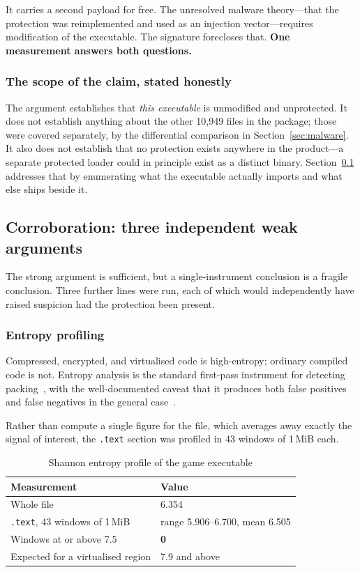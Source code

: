 It carries a second payload for free. The unresolved malware theory---that the
protection was reimplemented and used as an injection vector---requires
modification of the executable. The signature forecloses that. \textbf{One
measurement answers both questions.}

\subsubsection{The scope of the claim, stated honestly}

The argument establishes that \emph{this executable} is unmodified and
unprotected. It does not establish anything about the other 10{,}949 files in the
package; those were covered separately, by the differential comparison in
Section~\ref{sec:malware}. It also does not establish that no protection exists
anywhere in the product---a separate protected loader could in principle exist as
a distinct binary. Section~\ref{sec:corrob} addresses that by enumerating what
the executable actually imports and what else ships beside it.

\subsection{Corroboration: three independent weak arguments}
\label{sec:corrob}

The strong argument is sufficient, but a single-instrument conclusion is a fragile
conclusion. Three further lines were run, each of which would independently have
raised suspicion had the protection been present.

\subsubsection{Entropy profiling}

Compressed, encrypted, and virtualised code is high-entropy; ordinary compiled
code is not. Entropy analysis is the standard first-pass instrument for detecting
packing~\cite{lyda2007}, with the well-documented caveat that it produces both
false positives and false negatives in the general case~\cite{sokpacker}.

Rather than compute a single figure for the file, which averages away exactly the
signal of interest, the \verb|.text| section was profiled in 43 windows of 1\,MiB
each.

\begin{table}[htbp]
\caption{Shannon entropy profile of the game executable}
\label{tab:entropy}
\centering
\footnotesize
\begin{tabularx}{\columnwidth}{@{}L{3.3cm}X@{}}
\toprule
\textbf{Measurement} & \textbf{Value} \\
\midrule
Whole file & 6.354 \\
\verb|.text|, 43 windows of 1\,MiB & range 5.906--6.700, mean 6.505 \\
Windows at or above 7.5 & \textbf{0} \\
Expected for a virtualised region & 7.9 and above \\
\bottomrule
\end{tabularx}
\end{table}

